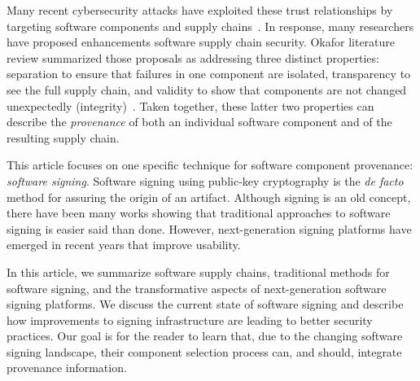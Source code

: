 \documentclass{IEEEcsmagTechrxiv}
\begin{document}
Many recent cybersecurity attacks have exploited these trust relationships by targeting software components and supply chains~\cite{Sonatype2024}.
In response, many researchers have proposed enhancements software supply chain security.
Okafor \etals literature review summarized those proposals as addressing three distinct properties:
  separation to ensure that failures in one component are isolated,
  transparency to see the full supply chain,
  and
  validity to show that components are not changed unexpectedly (integrity)~\cite{okafor_sok}.
Taken together, these latter two properties can describe the \textit{provenance} of both an individual software component and of the resulting supply chain.

This article focuses on one specific technique for software component provenance: \textit{software signing}.
Software signing using public-key cryptography is the \textit{de facto} method for assuring the origin of an artifact.
Although signing is an old concept, there have been many works showing that traditional approaches to software signing is easier said than done.
However, next-generation signing platforms have emerged in recent years that improve usability.

In this article, we summarize software supply chains, traditional methods for software signing, and the transformative aspects of next-generation software signing platforms.
We discuss the current state of software signing and describe how improvements to signing infrastructure are leading to better security practices.
Our goal is for the reader to learn that, due to the changing software signing landscape, their component selection process can, and should, integrate provenance information.
\end{document}
